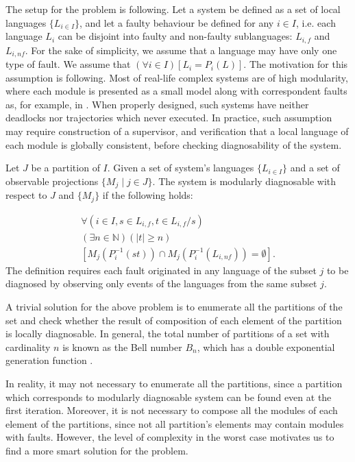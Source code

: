 The setup for the problem is following. Let a system be defined as a set of
local languages $\{L_{i\in I}\}$, and let a faulty behaviour be defined for any
$i \in I$, i.e. each language $L_i$ can be disjoint into faulty and non-faulty
sublanguages: $L_{i,f}$ and $L_{i,nf}$. 
For the sake of simplicity, we assume that a language may have only one type of
fault. We assume that $(\forall i \in I)\left[ L_i = P_i(L)\right]$. The
motivation for this assumption is following. Most of real-life complex systems
are of high modularity, where each module is presented as a small model along
with correspondent faults as, for example, in \cite{sartini_methodology_2010}.
When properly designed, such systems have neither deadlocks nor trajectories
which never executed. In practice, such assumption may require construction of a
supervisor, and verification that a local language of each module is globally
consistent, before checking diagnosability of the system.

\begin{definition}
Let $J$ be a partition of $I$. Given a set of system's languages $\{L_{i \in
I}\}$ and a set of observable projections $\{M_j \mid j \in J \}$. 
The system is modularly diagnosable with respect to $J$ and $\{M_j\}$ 
if the following holds:
\end{definition}
\begin{equation}
	\begin{array}{l}
		\forall(i \in I, s \in L_{i,f}, t \in L_{i,f}/s)
		\\
		(\exists n \in \mathbb{N})
		(|t| \geq n)
		\\
		\left[ M_j(P_i^{-1}(st)) \cap M_j(P_i^{-1}(L_{i,nf})) = \emptyset \right].
	\end{array}
\end{equation}
The definition requires each fault originated in any language of the subset $j$
to be diagnosed by observing only events of the languages from the same subset
$j$.

A trivial solution for the above problem is to enumerate all the partitions of
the set and check whether the result of composition of each element of the
partition is locally diagnosable. In general, the total number of partitions of
a set with cardinality $n$ is known as the Bell number $B_n$, which has a double
exponential generation function \cite{brualdi_introductory_2004}.

In reality, it may not necessary to enumerate all the partitions, since a
partition which corresponds to modularly diagnosable system can be found even at
the first iteration. Moreover, it is not necessary to compose all the modules of
each element of the partitions, since not all partition's elements may contain
modules with faults. However, the level of complexity in the worst case
motivates us to find a more smart solution for the problem.

